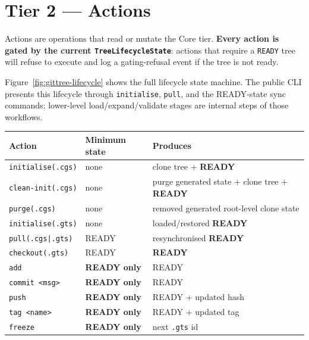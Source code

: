 \section{Tier 2 — Actions}
\label{sec:tier-actions}

Actions are operations that read or mutate the Core tier.  \textbf{Every
action is gated by the current \texttt{TreeLifecycleState}}: actions that
require a \texttt{READY} tree will refuse to execute and log a gating-refusal
event if the tree is not ready.

Figure~\ref{fig:gittree-lifecycle} shows the full lifecycle state machine. The
public CLI presents this lifecycle through \texttt{initialise}, \texttt{pull},
and the READY-state sync commands; lower-level load/expand/validate stages are
internal steps of those workflows.

\begin{center}
\begin{tabular}{lll}
\textbf{Action} & \textbf{Minimum state} & \textbf{Produces} \\
\hline
\texttt{initialise(.cgs)}              & none        & clone tree + \textbf{READY} \\
\texttt{clean-init(.cgs)}              & none        & purge generated state + clone tree + \textbf{READY} \\
\texttt{purge(.cgs)}                   & none        & removed generated root-level clone state \\
\texttt{initialise(.gts)}              & none        & loaded/restored \textbf{READY} \\
\texttt{pull(.cgs|.gts)}               & READY       & resynchronised \textbf{READY} \\
\texttt{checkout(.gts)}                & READY       & \textbf{READY} \\
\texttt{add}                           & \textbf{READY only} & READY \\
\texttt{commit <msg>}                  & \textbf{READY only} & READY \\
\texttt{push}                          & \textbf{READY only} & READY + updated hash \\
\texttt{tag <name>}                    & \textbf{READY only} & READY + updated tag \\
\texttt{freeze}                        & \textbf{READY only} & next \texttt{.gts} id \\
\hline
\end{tabular}
\end{center}


